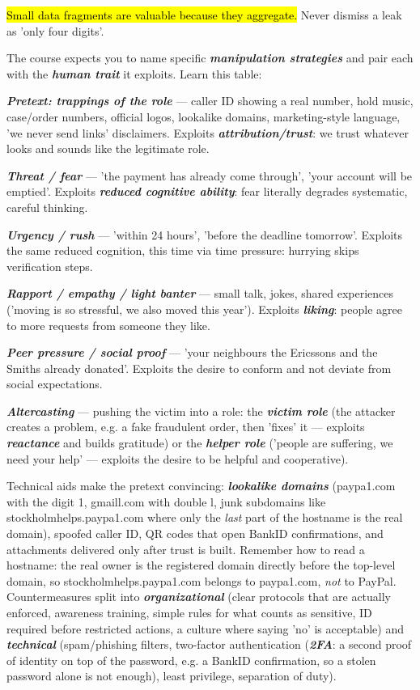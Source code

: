 \documentclass[12pt, a4paper]{article}
\newcommand{\term}[1]{\textbf{\textit{#1}}}        %
\newcommand{\imp}[1]{\hl{#1}}                       %
\begin{document}
\imp{Small data fragments are valuable because they aggregate.} Never dismiss a leak as 'only four digits'.

The course expects you to name specific \term{manipulation strategies} and pair each with the \term{human trait} it exploits. Learn this table:
\begin{tightitem}
\item \term{Pretext: trappings of the role} --- caller ID showing a real number, hold music, case/order numbers, official logos, lookalike domains, marketing-style language, 'we never send links' disclaimers. Exploits \term{attribution/trust}: we trust whatever looks and sounds like the legitimate role.
\item \term{Threat / fear} --- 'the payment has already come through', 'your account will be emptied'. Exploits \term{reduced cognitive ability}: fear literally degrades systematic, careful thinking.
\item \term{Urgency / rush} --- 'within 24 hours', 'before the deadline tomorrow'. Exploits the same reduced cognition, this time via time pressure: hurrying skips verification steps.
\item \term{Rapport / empathy / light banter} --- small talk, jokes, shared experiences ('moving is so stressful, we also moved this year'). Exploits \term{liking}: people agree to more requests from someone they like.
\item \term{Peer pressure / social proof} --- 'your neighbours the Ericssons and the Smiths already donated'. Exploits the desire to conform and not deviate from social expectations.
\item \term{Altercasting} --- pushing the victim into a role: the \term{victim role} (the attacker creates a problem, e.g. a fake fraudulent order, then 'fixes' it --- exploits \term{reactance} and builds gratitude) or the \term{helper role} ('people are suffering, we need your help' --- exploits the desire to be helpful and cooperative).
\end{tightitem}

Technical aids make the pretext convincing: \term{lookalike domains} (paypa1.com with the digit 1, gmaill.com with double l, junk subdomains like stockholmhelps.paypa1.com where only the \emph{last} part of the hostname is the real domain), spoofed caller ID, QR codes that open BankID confirmations, and attachments delivered only after trust is built.
Remember how to read a hostname: the real owner is the registered domain directly before the top-level domain, so stockholmhelps.paypa1.com belongs to paypa1.com, \emph{not} to PayPal.
Countermeasures split into \term{organizational} (clear protocols that are actually enforced, awareness training, simple rules for what counts as sensitive, ID required before restricted actions, a culture where saying 'no' is acceptable) and \term{technical} (spam/phishing filters, two-factor authentication (\term{2FA}: a second proof of identity on top of the password, e.g. a BankID confirmation, so a stolen password alone is not enough), least privilege, separation of duty).
\end{document}
